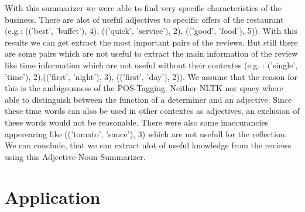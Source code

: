 \documentclass[sigchi]{acmart}
\begin{document}
	
	With this summarizer we were able to find very specific characteristics of the business. There are alot of useful adjectives to specific offers of the restaurant (e.g.: (('best', 'buffet'), 4), (('quick', 'service'), 2), (('good', 'food'), 5)). With this results we can get extract the most important pairs of the reviews. But still there are some pairs which are not useful to extract the main information of the review like time information which are not useful without their contextes (e.g. : ('single', 'time'), 2),(('first', 'night'), 3), (('first', 'day'), 2)). We assume that the reason for this is the ambigousness of 
	the POS-Tagging. Neither NLTK nor spacy where able to distinguish between the function of a determiner and an adjective. Since these time words can also be used in other contextes as adjectives, an exclusion of these words would not be reasonable. There were also some inaccurancies apperearing like  (('tomato', 'sauce'), 3) which are not usefull for the reflection.
	We can conclude, that we can extract alot of useful knowledge from the reviews using this Adjective-Noun-Summarizer. 
	
	\section{Application}
	
\end{document}
